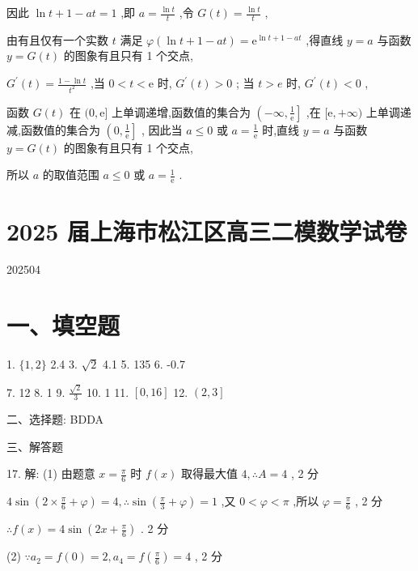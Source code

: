 \documentclass[10pt]{article}
\begin{document}
因此 \(\ln t + 1 - {at} = 1\) ,即 \(a = \frac{\ln t}{t}\) ,令 \(G\left( t\right)  = \frac{\ln t}{t}\) ,

由有且仅有一个实数 \(t\) 满足 \(\varphi \left( {\ln t + 1 - {at}}\right)  = {\mathrm{e}}^{\ln t + 1 - {at}}\) ,得直线 \(y = a\) 与函数 \(y = G\left( t\right)\) 的图象有且只有 1 个交点,

\({G}^{\prime }\left( t\right)  = \frac{1 - \ln t}{{t}^{2}}\) ,当 \(0 < t < \mathrm{e}\) 时, \({G}^{\prime }\left( t\right)  > 0\) ; 当 \(t > e\) 时, \({G}^{\prime }\left( t\right)  < 0\) ,

函数 \(G\left( t\right)\) 在 \((0,\mathrm{e}\rbrack\) 上单调递增,函数值的集合为 \(\left( {-\infty ,\frac{1}{\mathrm{e}}}\right\rbrack\) ,在 \(\lbrack \mathrm{e}, + \infty )\) 上单调递减,函数值的集合为 \(\left( {0,\frac{1}{\mathrm{e}}}\right\rbrack\) , 因此当 \(a \leq  0\) 或 \(a = \frac{1}{\mathrm{e}}\) 时,直线 \(y = a\) 与函数 \(y = G\left( t\right)\) 的图象有且只有 1 个交点,

所以 \(a\) 的取值范围 \(a \leq  0\) 或 \(a = \frac{1}{\mathrm{e}}\) .

\section*{2025 届上海市松江区高三二模数学试卷}

202504

\section*{一、填空题}

1. \(\{ 1,2\}\) 2.4 3. \(\sqrt{2}\) 4.1 5. 135 6. -0.7

7. 12 8. 1 9. \(\frac{\sqrt{2}}{3}\) 10. 1 11. \(\left\lbrack  {0,{16}}\right\rbrack\) 12. \(\left( {2,3}\right\rbrack\)

二、选择题: BDDA

三、解答题

17. 解: (1) 由题意 \(x = \frac{\pi }{6}\) 时 \(f\left( x\right)\) 取得最大值 \(4,\therefore A = 4\) , 2 分

\(4\sin \left( {2 \times  \frac{\pi }{6} + \varphi }\right)  = 4,\therefore \sin \left( {\frac{\pi }{3} + \varphi }\right)  = 1\) ,又 \(0 < \varphi  < \pi\) ,所以 \(\varphi  = \frac{\pi }{6}\) , 2 分

\(\therefore f\left( x\right)  = 4\sin \left( {{2x} + \frac{\pi }{6}}\right)\) . 2 分

(2) \(\because {a}_{2} = f\left( 0\right)  = 2,{a}_{4} = f\left( \frac{\pi }{6}\right)  = 4\) , 2 分
\end{document}
